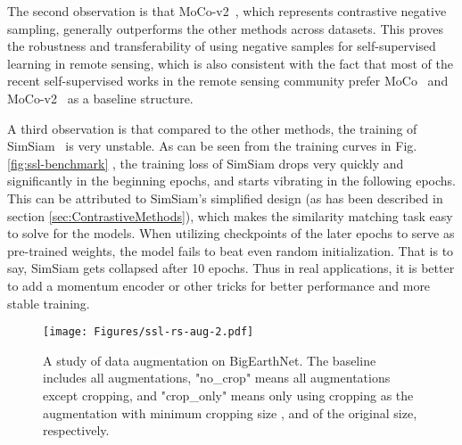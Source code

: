 \documentclass[lettersize,journal]{IEEEtran}
\begin{document}
The second observation is that MoCo-v2~\cite{chen2020improved}, which represents contrastive negative sampling, generally outperforms the other methods across datasets. This proves the robustness and transferability of using negative samples for self-supervised learning in remote sensing, which is also consistent with the fact that most of the recent self-supervised works in the remote sensing community prefer MoCo~\cite{he2020momentum} and MoCo-v2~\cite{chen2020improved} as a baseline structure.

\color{blue}
A third observation is that compared to the other methods, the training of SimSiam~\cite{chen2021exploring} is very unstable. As can be seen from the training curves in Fig. \ref{fig:ssl-benchmark} , the training loss of SimSiam drops very quickly and significantly in the beginning epochs, and starts vibrating in the following epochs. This can be attributed to SimSiam's simplified design (as has been described in section \ref{sec:ContrastiveMethods}), which makes the similarity matching task easy to solve for the models. When utilizing checkpoints of the later epochs to serve as pre-trained weights, the model fails to beat even random initialization. That is to say, SimSiam gets collapsed after 10 epochs. Thus in real applications, it is better to add a momentum encoder or other tricks for better performance and more stable training.
\color{black}

\begin{figure}[]
    \centering
    
    \texttt{[image: Figures/ssl-rs-aug-2.pdf]}
\caption{
    A study of data augmentation on BigEarthNet. The baseline includes all augmentations, "no\_crop" means all augmentations except cropping, and "crop\_only" means only using cropping as the augmentation with minimum cropping size ,  and  of the original size, respectively. 
    }
    \label{fig:rs-dataaug}
\end{figure}
\end{document}
